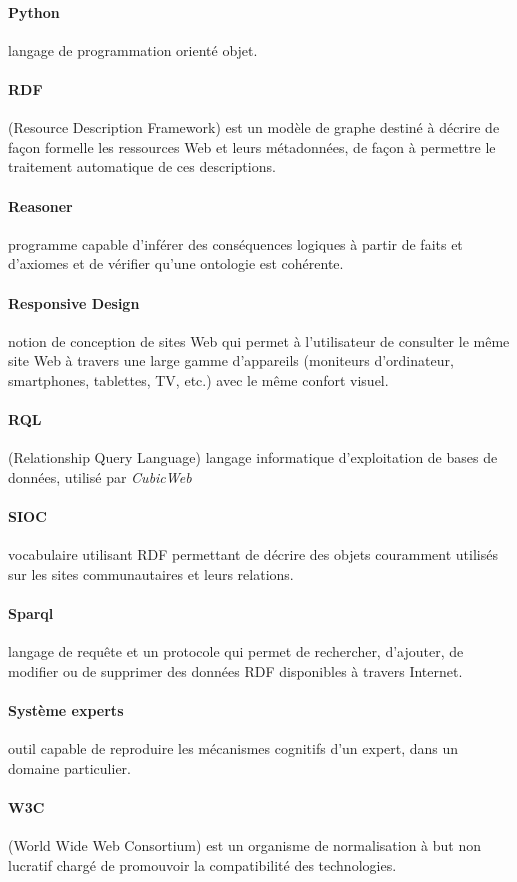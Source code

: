\documentclass {report}
\begin{document}
\paragraph{Python}langage de programmation orienté objet.
\paragraph{RDF}(Resource Description Framework) est un modèle de graphe destiné à décrire de façon formelle les ressources Web et leurs métadonnées, de façon à permettre le traitement automatique de ces descriptions.
\paragraph{Reasoner}programme capable d'inférer des conséquences logiques à partir de faits et d'axiomes et de vérifier qu'une ontologie est cohérente.
\paragraph{Responsive Design}notion de conception de sites Web qui permet à l'utilisateur de consulter le même site Web à travers une large gamme d'appareils (moniteurs d'ordinateur, smartphones, tablettes, TV, etc.) avec le même confort visuel.
\paragraph{RQL}(Relationship Query Language) langage informatique d'exploitation de bases de données, utilisé par \textit{CubicWeb}
\paragraph{SIOC}vocabulaire utilisant RDF permettant de décrire des objets couramment utilisés sur les sites communautaires et leurs relations.
\paragraph{Sparql}langage de requête et un protocole qui permet de rechercher, d'ajouter, de modifier ou de supprimer des données RDF disponibles à travers Internet.
\paragraph{Système experts}outil capable de reproduire les mécanismes cognitifs d'un expert, dans un domaine particulier.
\paragraph{W3C}(World Wide Web Consortium) est un organisme de normalisation à but non lucratif chargé de promouvoir la compatibilité des technologies.
\end{document}
